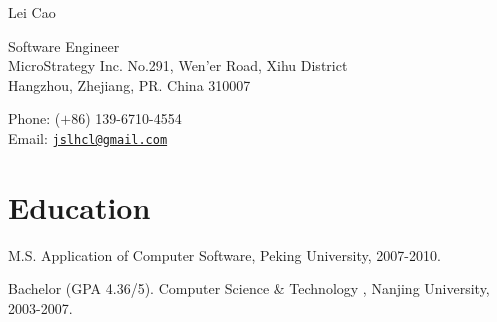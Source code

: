 \documentclass[letterpaper]{article}
\def\name{Lei Cao}
\renewenvironment{itemize}{
  \begin{list}{}{
    \setlength{\leftmargin}{1.5em}
    \setlength{\itemsep}{0pt}
  }
}{
  \end{list}
}
\begin{document}
{\huge \name}


\vspace{0.25in}
\begin{minipage}{0.55\linewidth}
  Software Engineer \\
  MicroStrategy Inc.
  No.291, Wen'er Road, Xihu District\\
  Hangzhou, Zhejiang, PR. China 310007
\end{minipage}
\vspace{0.25in}
\begin{minipage}{0.40\linewidth}
  Phone: ($+$86) 139-6710-4554 \\
  Email: \href{mailto:jslhcl@gmail.com}{\tt jslhcl@gmail.com} \\
\end{minipage}


\section*{Education}
\begin{itemize}
  \item M.S. Application of Computer Software, Peking University, 2007-2010.
  \item Bachelor (GPA 4.36/5). Computer Science \& Technology , Nanjing University, 2003-2007.
\end{itemize}

\end{document}

